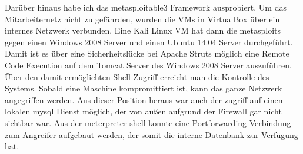 \documentclass[english,runningheads,a4paper]{llncs}[2018/03/10]
\begin{document}
Darüber hinaus habe ich das metasploitable3 Framework ausprobiert. Um das Mitarbeiternetz nicht zu gefährden, wurden die VMs in VirtualBox über ein internes Netzwerk verbunden. Eine Kali Linux VM hat dann die metasploits gegen einen Windows 2008 Server und einen Ubuntu 14.04 Server durchgeführt. Damit ist es über eine Sicherheitslücke bei Apache Struts möglich eine Remote Code Execution auf dem Tomcat Server des Windows 2008 Server auszuführen. Über den damit ermöglichten Shell Zugriff erreicht man die Kontrolle des Systems. Sobald eine Maschine kompromittiert ist, kann das ganze Netzwerk angegriffen werden. Aus dieser Position heraus war auch der zugriff auf einen lokalen mysql Dienst möglich, der von außen aufgrund der Firewall gar nicht sichtbar war. Aus der meterpreter shell konnte eine Portforwarding Verbindung zum Angreifer aufgebaut werden, der somit die interne Datenbank zur Verfügung hat.
\end{document}
